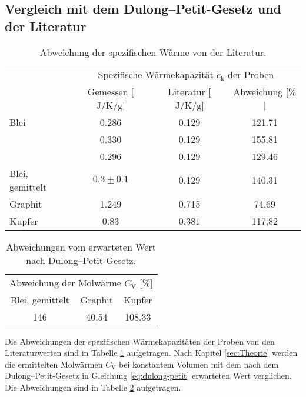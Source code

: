 \subsection{Vergleich mit dem Dulong--Petit-Gesetz und der Literatur}
\begin{table}[htbp]
	\centering
	\begin{tabular}{lccc}
		\toprule
		&\multicolumn{3}{c}{Spezifische Wärmekapazität $c_\text{k}$ der Proben}\\
		&{Gemessen [$\si{\joule\per\kelvin\per\gram}$]}  &{Literatur [$\si{\joule\per\kelvin\per\gram}$]}& {Abweichung [$\%$]}\\
		\midrule
		{Blei}	&0.286	&0.129	&121.71\\
				&0.330	&0.129	&155.81\\
		 		&0.296	&0.129	&129.46\\
		{Blei, gemittelt}	&$0.3\pm0.1$	&0.129	&140.31\\
		{Graphit}&1.249 &0.715& 74.69\\
		{Kupfer}&0.83	&0.381	& 117,82\\
		\bottomrule
	\end{tabular}
	\caption{Abweichung der spezifischen Wärme von der Literatur. \cite{waermekapazitaetkupfer} \cite{waermekapazitaetblei} }
	\label{tab:compare}
\end{table}
\begin{table}[htbp]
	\centering
	\begin{tabular}{ccc}
		\toprule
		\multicolumn{3}{c}{Abweichung der Molwärme $C_\text{V}$ [$\%$]}\\
		{Blei, gemittelt}	&{Graphit}&{Kupfer}\\
		\midrule
		146	&40.54	&108.33\\
		\bottomrule
	\end{tabular}
	\caption{Abweichungen vom erwarteten Wert nach Dulong--Petit-Gesetz.}
	\label{tab:failz}
\end{table}
Die Abweichungen der spezifischen Wärmekapazitäten der Proben von den Literaturwerten sind in Tabelle \ref{tab:compare} aufgetragen.
Nach Kapitel \ref{sec:Theorie} werden die ermittelten Molwärmen $C_\mathup{V}$ bei konstantem Volumen mit dem nach dem Dulong--Petit-Gesetz in Gleichung \eqref{eq:dulong-petit} erwarteten Wert verglichen.
Die Abweichungen sind in Tabelle \ref{tab:failz} aufgetragen. 
